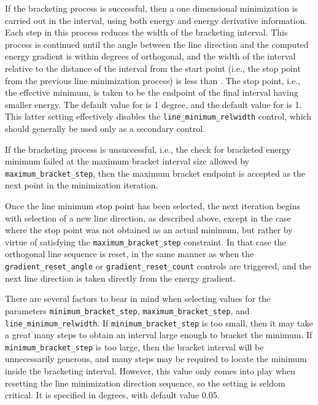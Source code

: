 \begin{description}
If the bracketing process is successful, then a one dimensional
minimization is carried out in the interval, using both energy and
energy derivative information.  Each step in this process reduces the
width of the bracketing interval.  This process is continued until
the angle between the line direction and the computed energy
gradient is within  degrees of
orthogonal, and the width of the interval relative to the distance of the
interval from the start point (i.e., the stop point from the previous
line minimization process) is less than
.  The stop point,
i.e., the effective minimum, is taken to be the endpoint of the final
interval having smaller energy.  The default value for
 is 1 degree, and the default value for
 is 1.  This latter setting effectively disables the
\texttt{line\_minimum\_relwidth} control, which should generally be used
only as a secondary control.

If the bracketing process is unsuccessful, i.e., the check for bracketed
energy minimum failed at the maximum bracket interval size allowed by
\texttt{maximum\_bracket\_step}, then the maximum bracket endpoint is
accepted as the next point in the minimization iteration.

Once the line minimum stop point has been selected, the next iteration
begins with selection of a new line direction, as described above,
except in the case where the stop point was not obtained as an actual
minimum, but rather by virtue of satisfying the
\texttt{maximum\_bracket\_step} constraint.  In that case the orthogonal
line sequence is reset, in the same manner as when the
\texttt{gradient\_reset\_angle} or \texttt{gradient\_reset\_count}
controls are triggered, and the next line direction is taken directly
from the energy gradient.

There are several factors to bear in mind when selecting values for
the parameters \texttt{minimum\_bracket\_step},
\texttt{maximum\_bracket\_step}, and \texttt{line\_minimum\_relwidth}.
If \texttt{minimum\_bracket\_step} is too small, then it may take a
great many steps to obtain an interval large enough to bracket the
minimum.  If \texttt{minimum\_bracket\_step} is too large, then the
bracket interval will be unnecessarily generous, and many steps may be
required to locate the minimum inside the bracketing interval.  However,
this value only comes into play when resetting the line minimization
direction sequence, so the setting is seldom critical.  It is specified
in degrees, with default value 0.05.


\end{description}
